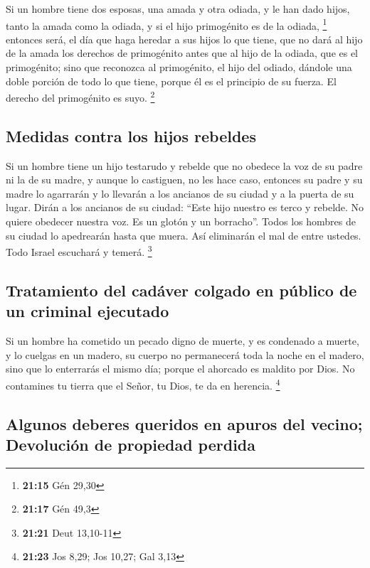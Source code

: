  Si un hombre tiene dos esposas, una amada y otra odiada,
y le han dado hijos, tanto la amada como la odiada, y si el hijo
primogénito es de la odiada, \footnote{\textbf{21:15} Gén 29,30}
 entonces será, el día que haga heredar a sus hijos lo
que tiene, que no dará al hijo de la amada los derechos de primogénito
antes que al hijo de la odiada, que es el primogénito; 
sino que reconozca al primogénito, el hijo del odiado, dándole una doble
porción de todo lo que tiene, porque él es el principio de su fuerza. El
derecho del primogénito es suyo. \footnote{\textbf{21:17} Gén 49,3}

\hypertarget{medidas-contra-los-hijos-rebeldes}{%
\subsection{Medidas contra los hijos
rebeldes}\label{medidas-contra-los-hijos-rebeldes}}

 Si un hombre tiene un hijo testarudo y rebelde que no
obedece la voz de su padre ni la de su madre, y aunque lo castiguen, no
les hace caso,  entonces su padre y su madre lo agarrarán
y lo llevarán a los ancianos de su ciudad y a la puerta de su lugar.
 Dirán a los ancianos de su ciudad: ``Este hijo nuestro
es terco y rebelde. No quiere obedecer nuestra voz. Es un glotón y un
borracho''.  Todos los hombres de su ciudad lo apedrearán
hasta que muera. Así eliminarán el mal de entre ustedes. Todo Israel
escuchará y temerá. \footnote{\textbf{21:21} Deut 13,10-11}

\hypertarget{tratamiento-del-caduxe1ver-colgado-en-puxfablico-de-un-criminal-ejecutado}{%
\subsection{Tratamiento del cadáver colgado en público de un criminal
ejecutado}\label{tratamiento-del-caduxe1ver-colgado-en-puxfablico-de-un-criminal-ejecutado}}

 Si un hombre ha cometido un pecado digno de muerte, y es
condenado a muerte, y lo cuelgas en un madero,  su cuerpo
no permanecerá toda la noche en el madero, sino que lo enterrarás el
mismo día; porque el ahorcado es maldito por Dios. No contamines tu
tierra que el Señor, tu Dios, te da en herencia. \footnote{\textbf{21:23}
  Jos 8,29; Jos 10,27; Gal 3,13}

\hypertarget{algunos-deberes-queridos-en-apuros-del-vecino-devoluciuxf3n-de-propiedad-perdida}{%
\subsection{Algunos deberes queridos en apuros del vecino; Devolución de
propiedad
perdida}\label{algunos-deberes-queridos-en-apuros-del-vecino-devoluciuxf3n-de-propiedad-perdida}}


